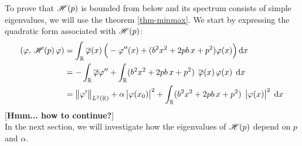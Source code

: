 To prove that $\mathscr{H}(p)$ is bounded from below and its spectrum consists of simple eigenvalues, we will use the theorem \ref{thm-minmax}. We start by expressing the quadratic form associated with $\mathscr{H}(p)$:
\begin{align*}
    (\varphi, \, \mathscr{H}(p) \, \varphi)
    &= \int_{\mathbb{R}} \overline{\varphi}(x) \, \Big( -\varphi''(x) + (b^2 x^2 + 2pb \, x + p^2) \varphi(x) \Big) \, \mathrm{d}x \,
    \\
    &= -\int_{\mathbb{R}} \overline{\varphi} \varphi''
    + \int_{\mathbb{R}} (b^2 x^2 + 2pb \, x + p^2) \;\, \overline{\varphi}(x) \, \varphi(x) \; \, \mathrm{d}x \,
    \\
    &= \big\lVert \varphi' \big\rVert_{L^2(\mathbb{R})}
    + \alpha \, \big|\varphi(x_0)\big|^2
    + \int_{\mathbb{R}} (b^2 x^2 + 2pb \, x + p^2) \;\, \big|\varphi(x)\big|^2 \; \, \mathrm{d}x \,
\end{align*}
[\textbf{Hmm... how to continue?}] \\
In the next section, we will investigate how the eigenvalues of $\mathscr{H}(p)$ depend on $p$ and $\alpha$.

